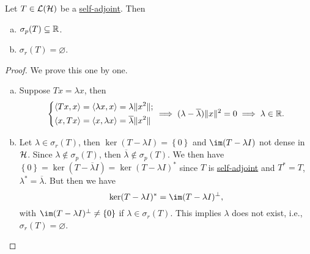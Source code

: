 \begin{lemma}
	Let \(T\in \mathcal{\MakeUppercase{l}} (\mathcal{\MakeUppercase{h}} )\) be a \hyperref[def:self-adjoint-op]{self-adjoint}. Then
	\begin{enumerate}[(a)]
		\item \(\sigma _p(T) \subseteq \mathbb{\MakeUppercase{r}} \).
		\item \(\sigma _r(T) = \varnothing \).
	\end{enumerate}
\end{lemma}
\begin{proof}
	We prove this one by one.
	\begin{enumerate}[(a)]
		\item Suppose \(Tx=\lambda x\), then
		      \[
			      \begin{dcases}
				      \left\langle Tx, x \right\rangle = \left\langle \lambda x, x \right\rangle = \lambda \lVert x^{2}  \rVert ; \\
				      \left\langle x, Tx \right\rangle = \left\langle x, \lambda x \right\rangle = \overline{\lambda} \lVert x^{2}  \rVert
			      \end{dcases}
			      \implies (\lambda - \overline{\lambda}) \lVert x \rVert ^{2} = 0 \implies \lambda \in \mathbb{\MakeUppercase{r}} .
		      \]
		\item Let \(\lambda \in \sigma _r(T)\), then \(\ker (T-\lambda I) = \left\{ 0 \right\} \) and \(\im (T-\lambda I)\) not dense in \(\mathcal{\MakeUppercase{h}} \). Since \(\lambda \notin \sigma _p(T)\), then \(\overline{\lambda} \notin \sigma _p(T)\). We then have \(\left\{ 0 \right\} = \ker (T-\overline{\lambda} I) = \ker (T-\lambda I)^{\ast} \) since \(T\) is \hyperref[def:self-adjoint-op]{self-adjoint} and \(T^{\ast} = T\), \(\lambda ^{\ast} = \overline{\lambda} \). But then we have
		      \[
			      \ker (T-\lambda I)^{\ast} = \im (T-\lambda I)^{\perp} ,
		      \]
		      with \(\im (T-\lambda I)^{\perp} \neq \left\{ 0 \right\} \) if \(\lambda \in \sigma _r(T)\). This implies \(\lambda \) does not exist, i.e., \(\sigma _r(T)= \varnothing \).
	\end{enumerate}
\end{proof}
